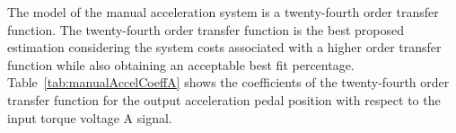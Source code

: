 \documentclass[journal,twoside,web]{ieeecolor}
\begin{document}
\vspace{12pt}
\noindent The model of the manual acceleration system is a twenty-fourth order transfer function. The twenty-fourth order transfer function is the best proposed estimation considering the system costs associated with a higher order transfer function while also obtaining an acceptable best fit percentage. Table~\ref{tab:manualAccelCoeffA} shows the coefficients of the twenty-fourth order transfer function for the output acceleration pedal position with respect to the input torque voltage A signal. %
%
\begin{table}[hbtp]
	\caption{Manual Mode Acceleration Transfer Function Torque Voltage A Coefficient Table}
	\label{tab:manualAccelCoeffA}
  \centering
    \begin{center}
    \end{center}
\end{table}
%
\end{document}
